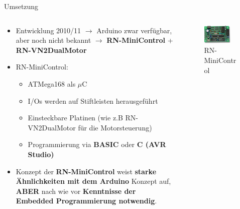 \documentclass{beamer}
\begin{document}
\begin{frame}{Umsetzung}
\begin{columns}
	\begin{column}{0.7\textwidth}
\begin{itemize}
	\item Entwicklung 2010/11 $\rightarrow$ Arduino zwar verf\"ugbar, aber noch nicht bekannt $\rightarrow$ \textbf{RN-MiniControl} + \textbf{RN-VN2DualMotor}
\end{itemize}
\begin{itemize}
	\item RN-MiniControl:
	\begin{itemize}
		\item ATMega168 als $\mu$C
		\item I/Os werden auf Stiftleisten herausgef\"uhrt
		\item Einsteckbare Platinen (wie z.B RN-VN2DualMotor f\"ur die Motorsteuerung)
		\item Programmierung via \textbf{BASIC} oder \textbf{C (AVR Studio)}
	\end{itemize}
\end{itemize}
\begin{itemize}
	\item Konzept der \textbf{RN-MiniControl} weist \textbf{starke \"Ahnlichkeiten mit dem Arduino} Konzept auf, \textbf{ABER} nach wie vor \textbf{Kenntnisse der Embedded Programmierung notwendig}.
\end{itemize}
	\end{column}
	\begin{column}{0.3\textwidth}
	\begin{figure}
		\centering
		\includegraphics[width=0.8\textwidth]{./images/rn-minicontrol.jpg}
		\caption{RN-MiniControl\cite{Image:RNMiniControl}}
	\end{figure}
	\begin{figure}

\end{figure}
\end{column}
\end{columns}
\end{frame}
\end{document}
